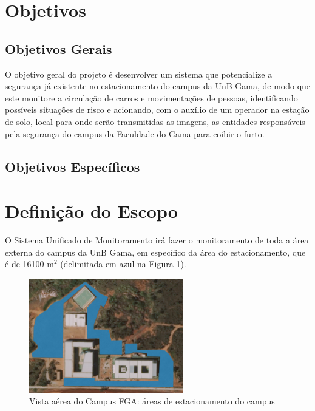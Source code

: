 
\section{Objetivos} %
\label{sec:objetivos}

  \subsection{Objetivos Gerais} %
  \label{sub:objetivos_gerais}

  O objetivo geral do projeto é desenvolver um sistema que potencialize a segurança já existente no estacionamento do campus da UnB Gama, de modo que este monitore a circulação de carros e movimentações de pessoas, identificando possíveis situações de risco e acionando, com o auxílio de um operador na estação de solo, local para onde serão transmitidas as imagens, as entidades responsáveis pela segurança do campus da Faculdade do Gama para coibir o furto.

  \subsection{Objetivos Específicos} %
  \label{sub:objetivos_espec_ficos}


\section{Definição do Escopo} %
\label{sec:defini_o_do_escopo}


  O Sistema Unificado de Monitoramento irá fazer o monitoramento de toda a área externa do campus da UnB Gama, em específico da área do estacionamento, que é de 16100 m$^2$ (delimitada em azul na Figura \ref{img:fga2}).

  \begin{figure}[H]
  	\centering
  	\includegraphics[width=0.6\textwidth]{figuras/fga2}
  	\caption[Vista aérea do Campus FGA:  áreas de estacionamento do campus]{Vista aérea do Campus FGA:  áreas de estacionamento do campus~\cite{mapa1}}
  	\label{img:fga2}
  \end{figure}

